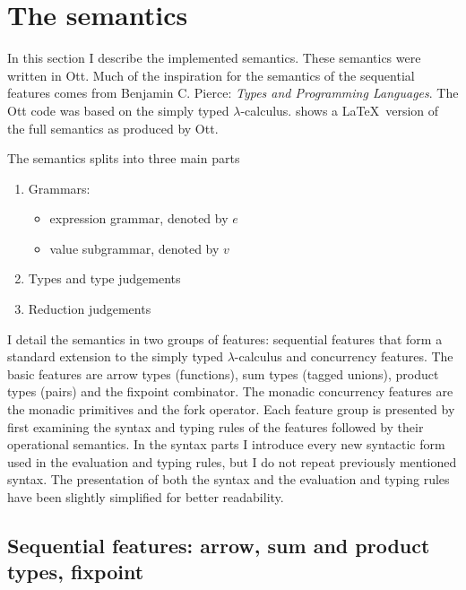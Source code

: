 \documentclass[12pt,twoside,notitlepage]{report}
\theoremstyle{plain}%
\theoremstyle{definition}
\theoremstyle{remark}
\begin{document}
\section{The semantics}\label{sec:the-semanticssec:the-semantics}
In this section I describe the implemented semantics. These semantics were written in Ott.  Much of the inspiration for the semantics of the sequential features comes from Benjamin C. Pierce: \textit{Types and Programming Languages}\cite{pierce2002types}. The Ott code was based on the simply typed $ \lambda $-calculus\cite{church1940formulation}.  shows a  \LaTeX\, version of the full semantics as produced by Ott.

 
The semantics splits into three main parts
\begin{enumerate}
\item{Grammars:\begin{itemize}
\item{expression grammar, denoted by $ e $}
\item{value subgrammar, denoted by $ v $}
\end{itemize}}
\item{Types and type judgements}
\item{Reduction judgements}
\end{enumerate}

I detail the semantics in two groups of features: sequential features that form a standard extension to the simply typed $ \lambda $-calculus and concurrency features. The basic features are arrow types (functions), sum types (tagged unions), product types (pairs) and the fixpoint combinator. The monadic concurrency features are the monadic primitives and the fork operator. Each feature group is presented by first examining the syntax and typing rules of the features followed by their operational semantics. In the syntax parts I introduce every new syntactic form used in the evaluation and typing rules, but I do not repeat previously mentioned syntax. The presentation of both the syntax and the evaluation and typing rules have been slightly simplified for better readability.   
\subsection{Sequential features: arrow, sum and product types, fixpoint}
\end{document}

